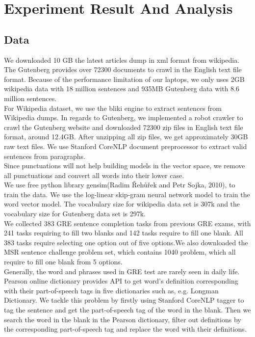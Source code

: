 \documentclass[11pt]{article}
\begin{document}
\section{Experiment Result And Analysis}
\subsection{Data}
We downloaded 10 GB the latest articles dump in xml format from wikipedia. The Gutenberg provides over 72300 documents to crawl in the English text file format. Because of the performance limitation of our laptops, we only uses 2GB wikipedia data with 18 million sentences  and 935MB Gutenberg data with 8.6 million sentences.\\
For Wikipedia dataset, we use the bliki engine to extract sentences from Wikipedia dumps. In regards to Gutenberg, we implemented a robot crawler to crawl the Gutenberg website and downloaded 72300 zip files in English text file format, around 12.4GB. After unzipping all zip files, we get approximately 30GB raw text files. We use Stanford CoreNLP document preprocessor to extract valid sentences from paragraphs. \\
Since punctuations will not help building models in the vector space, we remove all punctuations and convert all words into their lower case. \\
We use free python library gensim(Radim {\v R}eh{\r u}{\v r}ek and Petr Sojka, 2010), to train the data. We use the log-linear skip-gram neural network model to train the word vector model. The vocabulary size for wikipedia data set is 307k and the vocabulary size for Gutenberg data set is 297k.\\
We collected 383 GRE sentence completion tasks from previous GRE exams, with 241 tasks requiring to fill two blanks and 142 tasks require to fill one blank. All 383 tasks require selecting one option out of five options.We also downloaded the MSR sentence challenge problem set, which contains 1040 problem, which all require to fill one blank from 5 options.\\
Generally, the word and phrases used in GRE test are rarely seen in daily life. Pearson online dictionary provides API to get word's definition corresponding with their part-of-speech tags in five dictionaries such as, e.g. Longman Dictionary. We tackle this problem by firstly using Stanford CoreNLP tagger to tag the sentence and get the part-of-speech tag of the word in the blank. Then we search the word in the blank in the Pearson dictionary, filter out definitions by the corresponding part-of-speech tag and replace the word with their definitions. 
\end{document}

